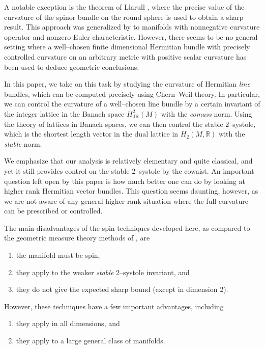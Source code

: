 \documentclass[12pt]{amsart}
\theoremstyle{definition}
\numberwithin{equation}{section}
\newcommand{\R}{\mathbb{R}}
\begin{document}
A notable exception is the theorem of Llarull \cite{Llarull}, where the precise value of the curvature of the spinor bundle on the round sphere is used to obtain a sharp result. This approach was generalized by \cite{Goette-Semmelmann, Tony} to manifolds with nonnegative curvature operator and nonzero Euler characteristic. However, there seems to be no general setting where a well--chosen finite dimensional Hermitian bundle with precisely controlled curvature on an arbitrary metric with positive scalar curvature has been used to deduce geometric conclusions. 

In this paper, we take on this task by studying the curvature of Hermitian \emph{line} bundles, which can be computed precisely using Chern--Weil theory. In particular, we can control the curvature of a well--chosen line bundle by a certain invariant of the integer lattice in the Banach space $H^2_{\mathrm{dR}}(M)$ with the \emph{comass} norm. Using the theory of lattices in Banach spaces, we can then control the stable 2--systole, which is the shortest length vector in the dual lattice in $H_2(M, \R)$ with the \emph{stable} norm.

We emphasize that our analysis is relatively elementary and quite classical, and yet it still provides control on the stable 2--systole by the cowaist. An important question left open by this paper is how much better one can do by looking at higher rank Hermitian vector bundles. This question seems daunting, however, as we are not aware of any general higher rank situation where the full curvature can be prescribed or controlled.

The main disadvantages of the spin techniques developed here, as compared to the geometric measure theory methods of \cite{BBN:sys, Zhu:txs2, Richard:s2xs2}, are
\begin{enumerate}
\item the manifold must be spin,
\item they apply to the weaker \emph{stable} 2--systole invariant, and
\item they do not give the expected sharp bound (except in dimension 2).
\end{enumerate}
However, these techniques have a few important advantages, including
\begin{enumerate}
\item they apply in all dimensions, and
\item they apply to a large general class of manifolds.
\end{enumerate}
\end{document}
